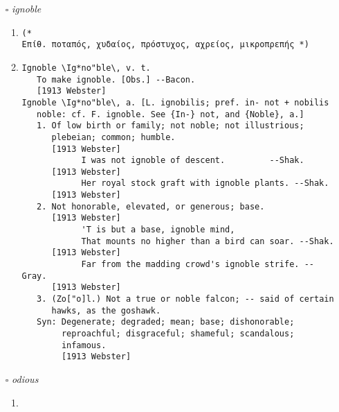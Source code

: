 \documentclass{article}
\begin{document}
\begin{itemize}
\begin{enumerate}
{\begin{lstlisting}
      or enterprise.
   Syn: Destitute, lost; abandoned; forsaken; solitary;
        helpless; friendless; hopeless; abject; wretched;
        miserable; pitiable.
        [1913 Webster]
Forlese \For*lese"\, v. t. [p. p. {Forlore}, {Forlorn}.] [OE.
   forlesen. See {Forlorn}.]
   To lose utterly. [Obs.] --haucer.
   [1913 Webster]
Forlorn \For*lorn"\, n.
   1. A lost, forsaken, or solitary person.
      [1913 Webster]
            Forced to live in Scotland a forlorn. --Shak.
      [1913 Webster]
   2. A forlorn hope; a vanguard. [Obs.]
      [1913 Webster]
            Our forlorn of horse marched within a mile of the
            enemy.                                --Oliver
                                                  Cromvell.
      [1913 Webster]
\end{lstlisting}}
\end{enumerate}
\item[$\square$] \emph{ ignoble }
\begin{enumerate}
\item{
\begin{lstlisting}
(* 
Επίθ. ποταπός, χυδαίος, πρόστυχος, αχρείος, μικροπρεπής *)
\end{lstlisting}}
\item{
\begin{lstlisting}
Ignoble \Ig*no"ble\, v. t.
   To make ignoble. [Obs.] --Bacon.
   [1913 Webster]
Ignoble \Ig*no"ble\, a. [L. ignobilis; pref. in- not + nobilis
   noble: cf. F. ignoble. See {In-} not, and {Noble}, a.]
   1. Of low birth or family; not noble; not illustrious;
      plebeian; common; humble.
      [1913 Webster]
            I was not ignoble of descent.         --Shak.
      [1913 Webster]
            Her royal stock graft with ignoble plants. --Shak.
      [1913 Webster]
   2. Not honorable, elevated, or generous; base.
      [1913 Webster]
            'T is but a base, ignoble mind,
            That mounts no higher than a bird can soar. --Shak.
      [1913 Webster]
            Far from the madding crowd's ignoble strife. --Gray.
      [1913 Webster]
   3. (Zo["o]l.) Not a true or noble falcon; -- said of certain
      hawks, as the goshawk.
   Syn: Degenerate; degraded; mean; base; dishonorable;
        reproachful; disgraceful; shameful; scandalous;
        infamous.
        [1913 Webster]
\end{lstlisting}}
\end{enumerate}
\item[$\square$] \emph{ odious }
\begin{enumerate}
\item{
}
\end{enumerate}
\end{itemize}
\end{document}
